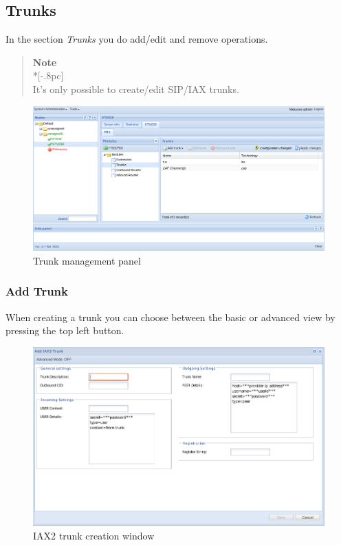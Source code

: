 \subsection{Trunks}

In the section \emph{Trunks} you do add/edit and remove operations.

\begin{quote}
	{\large \bf Note} \\*[-.8pc]
	\underline{\hspace{6in}} \\
    It's only possible to create/edit SIP/IAX trunks.
\end{quote}

\begin{figure}[H]
        \begin{center}
        \includegraphics[scale=0.45]{screenshots/etvoip_pbx_trunks.png}
        \caption{Trunk management panel}
        \label{fig:etvoip_pbx_trunks}
        \end{center}
\end{figure}

\subsubsection{Add Trunk}
\label{sec:etvoip_pbx_trunks_add}
When creating a trunk you can choose between the basic or advanced view by pressing the top left button.

\begin{figure}[H]
        \begin{center}
        \includegraphics[scale=0.45]{screenshots/etvoip_pbx_trunks_iax.png}
        \caption{IAX2 trunk creation window}
        \label{fig:etvoip_pbx_trunks_iax}
        \end{center}
\end{figure}


